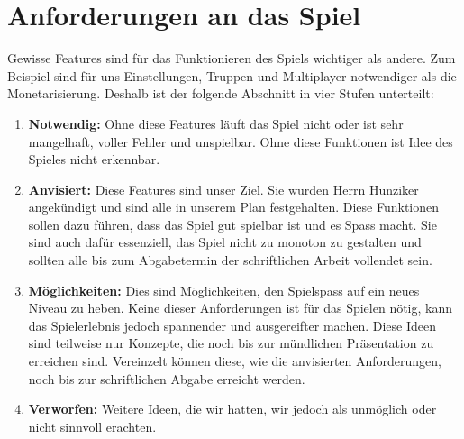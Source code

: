 \section{Anforderungen an das Spiel}
\label{chap:foo}
Gewisse \glspl{Feature} sind für das Funktionieren des Spiels wichtiger als andere.
Zum Beispiel sind für uns Einstellungen, Truppen und Multiplayer notwendiger als die Monetarisierung.
Deshalb ist der folgende Abschnitt in vier Stufen unterteilt:
\begin{enumerate}
    \item \textbf{Notwendig:}
        Ohne diese Features läuft das Spiel nicht oder ist sehr mangelhaft,
        voller Fehler und unspielbar. Ohne diese Funktionen ist Idee des Spieles nicht erkennbar.
    \item \textbf{Anvisiert:}
        Diese Features sind unser Ziel. Sie wurden Herrn Hunziker angekündigt und sind alle in unserem Plan festgehalten.
        Diese Funktionen sollen dazu führen, dass das Spiel
        gut spielbar ist und es Spass macht. Sie sind auch dafür essenziell, das Spiel nicht zu monoton zu gestalten und sollten
        alle bis zum Abgabetermin der schriftlichen Arbeit vollendet sein.
    \item \textbf{Möglichkeiten:}
        Dies sind Möglichkeiten, den Spielspass auf ein neues Niveau zu heben. Keine dieser Anforderungen ist für das Spielen nötig,
        kann das Spielerlebnis jedoch spannender und ausgereifter machen. Diese
        Ideen sind teilweise nur Konzepte, die noch bis zur mündlichen Präsentation zu erreichen sind.
        Vereinzelt können diese, wie die anvisierten Anforderungen, noch bis zur schriftlichen Abgabe erreicht werden.
    \item \textbf{Verworfen:}
        Weitere Ideen, die wir hatten, wir jedoch als unmöglich oder nicht sinnvoll erachten.
\end{enumerate}


